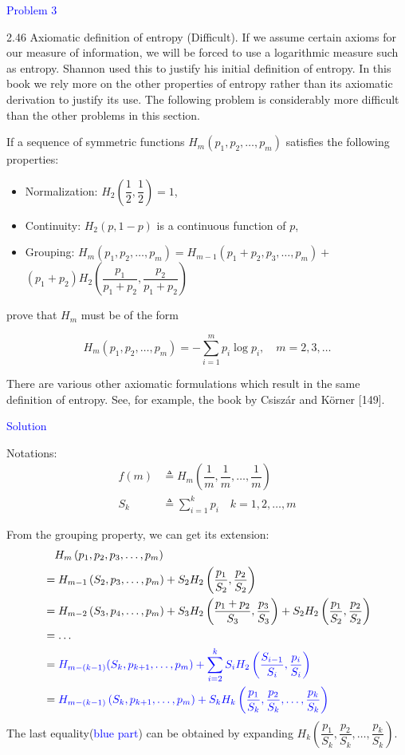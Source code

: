 \textcolor{blue}{Problem 3}

2.46 Axiomatic definition of entropy (Difficult). If we assume certain axioms for our measure of information, we will be forced to use a logarithmic measure such as entropy. Shannon used this to justify his initial definition of entropy. In this book we rely more on the other properties of entropy rather than its axiomatic derivation to justify its use. The following problem is considerably more difficult than the other problems in this section.

If a sequence of symmetric functions $H_m\left(p_1, p_2, \ldots, p_m\right)$ satisfies the following properties:
\begin{itemize}
\item Normalization: $H_2\left(\dfrac{1}{2}, \dfrac{1}{2}\right)=1$,
\item Continuity: $H_2(p, 1-p)$ is a continuous function of $p$,
\item Grouping: $H_m\left(p_1, p_2, \ldots, p_m\right)=H_{m-1}\left(p_1+p_2, p_3, \ldots, p_m\right)+$ $\left(p_1+p_2\right) H_2\left(\dfrac{p_1}{p_1+p_2}, \dfrac{p_2}{p_1+p_2}\right)$
\end{itemize}
prove that $H_m$ must be of the form

$$H_m\left(p_1, p_2, \ldots, p_m\right)=-\sum_{i=1}^m p_i \log p_i, \quad m=2,3, \ldots$$

There are various other axiomatic formulations which result in the
same definition of entropy. See, for example, the book by Csiszár and Körner [149].

\textcolor{blue}{Solution}

Notations:
\begin{align*}
f(m) &\triangleq H_m\left(\dfrac{1}{m}, \dfrac{1}{m}, \ldots, \dfrac{1}{m}\right) \\
S_k &\triangleq \sum_{i=1}^k p_i \quad k=1,2,\ldots,m
\end{align*}

From the grouping property, we can get its extension:
\begin{align*}
&\quad H_m\left(p_1,p_2, p_3, \ldots, p_m\right) \\
&= H_{m-1}\left(S_2, p_3, \ldots, p_m\right)+S_2 H_2\left(\dfrac{p_1}{S_2}, \dfrac{p_2}{S_2}\right) \\
&= H_{m-2}\left(S_3, p_4, \ldots, p_m\right)+S_3 H_2\left(\dfrac{p_1+p_2}{S_3}, \dfrac{p_3}{S_3}\right)+S_2 H_2\left(\dfrac{p_1}{S_2}, \dfrac{p_2}{S_2}\right) \\
&= \ldots \\
&= \textcolor{blue}{H_{m-(k-1)}(S_k, p_{k+1}, \ldots, p_m)+\sum_{i=2}^k S_iH_2\left(\dfrac{S_{i-1}}{S_i}, \dfrac{p_i}{S_i}\right)} \\
&= \textcolor{blue}{H_{m-(k-1)}\left(S_{k}, p_{k+1}, \ldots, p_m\right) + S_kH_k\left(\dfrac{p_1}{S_k}, \dfrac{p_2}{S_k}, \ldots, \dfrac{p_{k}}{S_k}\right)}
\end{align*}
The last equality(\textcolor{blue}{blue part}) can be obtained by expanding $H_k\left(\dfrac{p_1}{S_k}, \dfrac{p_2}{S_k}, \ldots, \dfrac{p_{k}}{S_k}\right)$.

